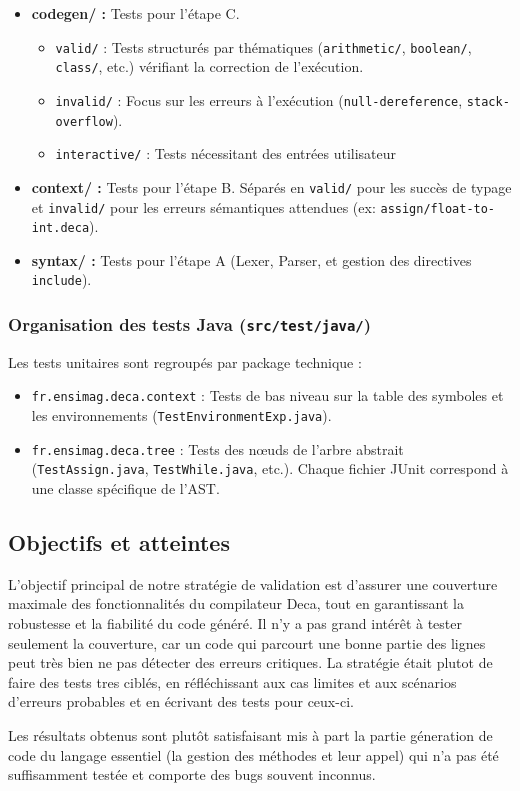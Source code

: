 \begin{itemize}[label=$\circ$]
    \item \textbf{codegen/ :} Tests pour l'étape C.
    \begin{itemize}[label=$\circ$]
        \item \texttt{valid/} : Tests structurés par thématiques (\texttt{arithmetic/}, \texttt{boolean/}, \texttt{class/}, etc.) vérifiant la correction de l'exécution.
        \item \texttt{invalid/} : Focus sur les erreurs à l'exécution (\texttt{null-dereference}, \texttt{stack-overflow}).
        \item \texttt{interactive/} : Tests nécessitant des entrées utilisateur
    \end{itemize}
    \item \textbf{context/ :} Tests pour l'étape B. Séparés en \texttt{valid/} pour les succès de typage et \texttt{invalid/} pour les erreurs sémantiques attendues (ex: \texttt{assign/float-to-int.deca}).
    \item \textbf{syntax/ :} Tests pour l'étape A (Lexer, Parser, et gestion des directives \texttt{include}).
\end{itemize}

\subsubsection{Organisation des tests Java (\texttt{src/test/java/})}
Les tests unitaires sont regroupés par package technique :
\begin{itemize}[label=$\circ$]
    \item \texttt{fr.ensimag.deca.context} : Tests de bas niveau sur la table des symboles et les environnements (\texttt{TestEnvironmentExp.java}).
    \item \texttt{fr.ensimag.deca.tree} : Tests des nœuds de l'arbre abstrait (\texttt{TestAssign.java}, \texttt{TestWhile.java}, etc.). Chaque fichier JUnit correspond à une classe spécifique de l'AST.
\end{itemize}

\subsection{Objectifs et atteintes}
\noindent
L'objectif principal de notre stratégie de validation est d'assurer une couverture maximale des fonctionnalités du compilateur Deca, tout en garantissant la robustesse et la fiabilité du code généré. Il n'y a pas grand intérêt à tester seulement la couverture, car un code qui parcourt une bonne partie des lignes peut très bien ne pas détecter des erreurs critiques. La stratégie était plutot de faire des tests tres ciblés, en réfléchissant aux cas limites et aux scénarios d'erreurs probables et en écrivant des tests pour ceux-ci. 

\noindent
Les résultats obtenus sont plutôt satisfaisant mis à part la partie géneration de code du langage essentiel (la gestion des méthodes et leur appel) qui n'a pas été suffisamment testée et comporte des bugs souvent inconnus.